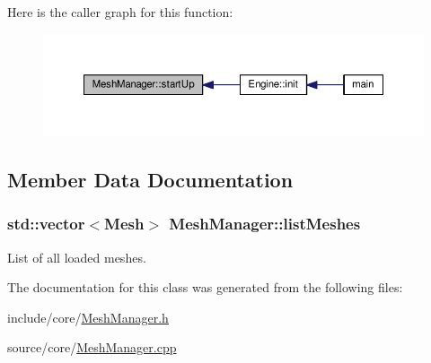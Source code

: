 Here is the caller graph for this function\-:
\nopagebreak
\begin{figure}[H]
\begin{center}
\leavevmode
\includegraphics[width=350pt]{classMeshManager_a0ea3bdc14ec06816ece638ebeefd835e_icgraph}
\end{center}
\end{figure}




\subsection{Member Data Documentation}
\hypertarget{classMeshManager_af4b938ca5dbb0432d9747818f0aa1fd5}{
\subsubsection[{list\-Meshes}]{\setlength{\rightskip}{0pt plus 5cm}std\-::vector$<${\bf Mesh}$>$ Mesh\-Manager\-::list\-Meshes}}\label{classMeshManager_af4b938ca5dbb0432d9747818f0aa1fd5}
List of all loaded meshes. 

The documentation for this class was generated from the following files\-:\begin{DoxyCompactItemize}
\item 
include/core/\hyperlink{MeshManager_8h}{Mesh\-Manager.\-h}\item 
source/core/\hyperlink{MeshManager_8cpp}{Mesh\-Manager.\-cpp}\end{DoxyCompactItemize}
